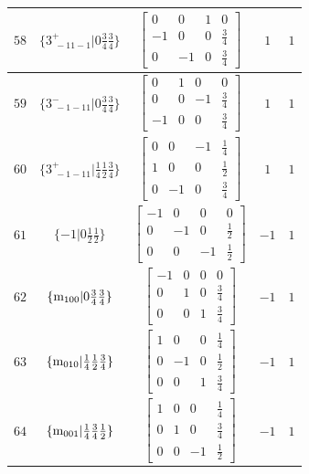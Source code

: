 \documentclass[fleqn,8pt]{jsarticle}
\begin{document}
\begin{longtable}{ccccc}
$ 58 $ & $ \{3^{+}_{\,\,-11-1}|0 \frac{3}{4} \frac{3}{4}\} $ & $ \begin{bmatrix} 0 & 0 & 1 & 0 \\ -1 & 0 & 0 & \frac{3}{4} \\ 0 & -1 & 0 & \frac{3}{4} \end{bmatrix} $ & $ 1 $ & $ 1 $ \\ \hline
$ 59 $ & $ \{3^{-}_{\,\,-1-11}|0 \frac{3}{4} \frac{3}{4}\} $ & $ \begin{bmatrix} 0 & 1 & 0 & 0 \\ 0 & 0 & -1 & \frac{3}{4} \\ -1 & 0 & 0 & \frac{3}{4} \end{bmatrix} $ & $ 1 $ & $ 1 $ \\ \hline
$ 60 $ & $ \{3^{+}_{\,\,-1-11}|\frac{1}{4} \frac{1}{2} \frac{3}{4}\} $ & $ \begin{bmatrix} 0 & 0 & -1 & \frac{1}{4} \\ 1 & 0 & 0 & \frac{1}{2} \\ 0 & -1 & 0 & \frac{3}{4} \end{bmatrix} $ & $ 1 $ & $ 1 $ \\ \hline
$ 61 $ & $ \{-1|0 \frac{1}{2} \frac{1}{2}\} $ & $ \begin{bmatrix} -1 & 0 & 0 & 0 \\ 0 & -1 & 0 & \frac{1}{2} \\ 0 & 0 & -1 & \frac{1}{2} \end{bmatrix} $ & $ -1 $ & $ 1 $ \\ \hline
$ 62 $ & $ \{{\rm m}_{100}|0 \frac{3}{4} \frac{3}{4}\} $ & $ \begin{bmatrix} -1 & 0 & 0 & 0 \\ 0 & 1 & 0 & \frac{3}{4} \\ 0 & 0 & 1 & \frac{3}{4} \end{bmatrix} $ & $ -1 $ & $ 1 $ \\ \hline
$ 63 $ & $ \{{\rm m}_{010}|\frac{1}{4} \frac{1}{2} \frac{3}{4}\} $ & $ \begin{bmatrix} 1 & 0 & 0 & \frac{1}{4} \\ 0 & -1 & 0 & \frac{1}{2} \\ 0 & 0 & 1 & \frac{3}{4} \end{bmatrix} $ & $ -1 $ & $ 1 $ \\ \hline
$ 64 $ & $ \{{\rm m}_{001}|\frac{1}{4} \frac{3}{4} \frac{1}{2}\} $ & $ \begin{bmatrix} 1 & 0 & 0 & \frac{1}{4} \\ 0 & 1 & 0 & \frac{3}{4} \\ 0 & 0 & -1 & \frac{1}{2} \end{bmatrix} $ & $ -1 $ & $ 1 $ \\ \hline

\end{longtable}
\end{document}
